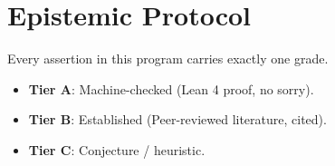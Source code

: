 \section{Epistemic Protocol}\label{sec:protocol}
Every assertion in this program carries exactly one grade.
\begin{itemize}
    \item \textbf{Tier A}: Machine-checked (Lean 4 proof, no sorry).
    \item \textbf{Tier B}: Established (Peer-reviewed literature, cited).
    \item \textbf{Tier C}: Conjecture / heuristic.
\end{itemize}
